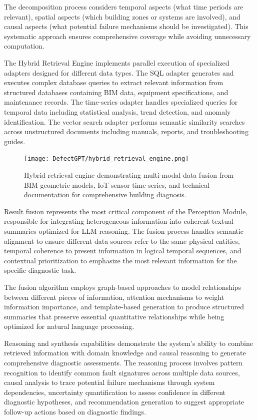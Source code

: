 The decomposition process considers temporal aspects (what time periods are relevant), spatial aspects (which building zones or systems are involved), and causal aspects (what potential failure mechanisms should be investigated). This systematic approach ensures comprehensive coverage while avoiding unnecessary computation.

The Hybrid Retrieval Engine implements parallel execution of specialized adapters designed for different data types. The SQL adapter generates and executes complex database queries to extract relevant information from structured databases containing BIM data, equipment specifications, and maintenance records. The time-series adapter handles specialized queries for temporal data including statistical analysis, trend detection, and anomaly identification. The vector search adapter performs semantic similarity searches across unstructured documents including manuals, reports, and troubleshooting guides.

\begin{figure}[htbp]
\centering
\texttt{[image: DefectGPT/hybrid\_retrieval\_engine.png]}

\caption{Hybrid retrieval engine demonstrating multi-modal data fusion from BIM geometric models, IoT sensor time-series, and technical documentation for comprehensive building diagnosis.}
\label{fig:hybrid_retrieval_engine}
\end{figure}

Result fusion represents the most critical component of the Perception Module, responsible for integrating heterogeneous information into coherent textual summaries optimized for LLM reasoning. The fusion process handles semantic alignment to ensure different data sources refer to the same physical entities, temporal coherence to present information in logical temporal sequences, and contextual prioritization to emphasize the most relevant information for the specific diagnostic task.

The fusion algorithm employs graph-based approaches to model relationships between different pieces of information, attention mechanisms to weight information importance, and template-based generation to produce structured summaries that preserve essential quantitative relationships while being optimized for natural language processing.

Reasoning and synthesis capabilities demonstrate the system's ability to combine retrieved information with domain knowledge and causal reasoning to generate comprehensive diagnostic assessments. The reasoning process involves pattern recognition to identify common fault signatures across multiple data sources, causal analysis to trace potential failure mechanisms through system dependencies, uncertainty quantification to assess confidence in different diagnostic hypotheses, and recommendation generation to suggest appropriate follow-up actions based on diagnostic findings.

